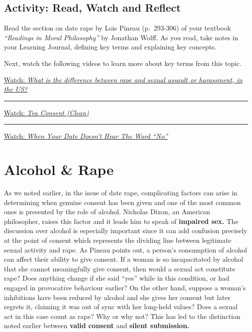 \documentclass[
]{book}
\begin{document}
\hypertarget{activity-read-watch-and-reflect-7}{%
\subsection*{Activity: Read, Watch and Reflect}\label{activity-read-watch-and-reflect-7}}

\begin{reflect}
Read the section on date rape by Lois Pineau (p.~293-306) of your textbook \emph{``Readings in Moral Philosophy''} by Jonathan Wolff. As you read, take notes in your Learning Journal, defining key terms and explaining key concepts.

Next, watch the following videos to learn more about key terms from this topic.

\href{https://www.youtube.com/watch?v=0T3EMaKpGSQ}{Watch: \emph{What is the difference between rape and sexual assault or harassment, in the US?}}

\begin{center}\rule{0.5\linewidth}{0.5pt}\end{center}

\href{https://www.youtube.com/watch?v=fGoWLWS4-kU}{Watch: \emph{Tea Consent (Clean)}}

\begin{center}\rule{0.5\linewidth}{0.5pt}\end{center}

\href{https://www.youtube.com/watch?v=qj_OcHp7zm8}{Watch: \emph{When Your Date Doesn't Hear The Word ``No''}}
\end{reflect}

\hypertarget{alcohol-rape}{%
\section{Alcohol \& Rape}\label{alcohol-rape}}

As we noted earlier, in the issue of date rape, complicating factors can arise in determining when genuine consent has been given and one of the most common ones is presented by the role of alcohol. Nicholas Dixon, an American philosopher, raises this factor and it leads him to speak of \textbf{impaired sex.} The discussion over alcohol is especially important since it can add confusion precisely at the point of consent which represents the dividing line between legitimate sexual activity and rape. As Pineau points out, a person's consumption of alcohol can affect their ability to give consent. If a woman is so incapacitated by alcohol that she cannot meaningfully give consent, then would a sexual act constitute rape? Does anything change if she said ``yes'' while in this condition, or had engaged in provocative behaviour earlier? On the other hand, suppose a woman's inhibitions have been reduced by alcohol and she gives her consent but later regrets it, claiming it was out of sync with her long-held values? Does a sexual act in this case count as rape? Why or why not? This has led to the distinction noted earlier between \textbf{valid consent} and \textbf{silent submission.}
\end{document}
